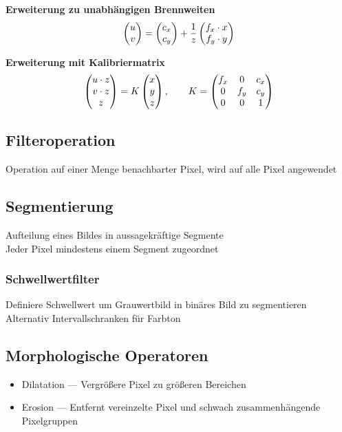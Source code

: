 \textbf{Erweiterung zu unabhängigen Brennweiten}\\
\[\begin{pmatrix}u \\ v\end{pmatrix} = \begin{pmatrix}c_x \\ c_y\end{pmatrix} + \frac{1}{z}\begin{pmatrix}f_x \cdot x \\ f_y \cdot y\end{pmatrix}\]

\textbf{Erweiterung mit Kalibriermatrix}\\
\[\begin{pmatrix}u \cdot z\\ v \cdot z\\ z\end{pmatrix} = K \begin{pmatrix}x \\ y \\ z\end{pmatrix}, \qquad K = \begin{pmatrix}f_x & 0 & c_x\\ 0 & f_y & c_y \\ 0 & 0 & 1\end{pmatrix}\]

\subsection{Filteroperation}%
\label{bv:sub:filteroperation}
Operation auf einer Menge benachbarter Pixel, wird auf alle Pixel angewendet

\subsection{Segmentierung}%
\label{bv:sub:segmentierung}
Aufteilung eines Bildes in aussagekräftige Segmente\\
Jeder Pixel mindestens einem Segment zugeordnet

\subsubsection{Schwellwertfilter}%
\label{bv:ssub:schwellwertfilter}
Definiere Schwellwert um Grauwertbild in binäres Bild zu segmentieren\\
Alternativ Intervallschranken für Farbton

\subsection{Morphologische Operatoren}%
\label{bv:sub:morphologische-operatoren}
\begin{itemize}
\item Dilatation --- Vergrößere Pixel zu größeren Bereichen
\item Erosion --- Entfernt vereinzelte Pixel und schwach zusammenhängende Pixelgruppen
\end{itemize}

